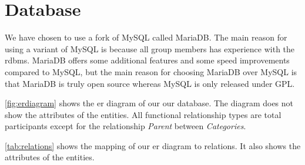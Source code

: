 \section{Database}\label{sec:design_database}
We have chosen to use a fork of MySQL called MariaDB. The main reason for using a variant of MySQL is because all group members has experience with the \ac{rdbms}. MariaDB offers some additional features and some speed improvements compared to MySQL, but the main reason for choosing MariaDB over MySQL is that MariaDB is truly open source whereas MySQL is only released under GPL.\cite{mariavsmysql}

\autoref{fig:erdiagram} shows the \ac{er} diagram of our our database. The diagram does not show the attributes of the entities. All functional relationship types are total participants except for the relationship \textit{Parent} between \textit{Categories}.

\autoref{tab:relations} shows the mapping of our \ac{er} diagram to relations. It also shows the attributes of the entities.


\newcommand{\relation}[1]{[\{ #1 \}]\\}
\newcommand{\us}{\textunderscore}


